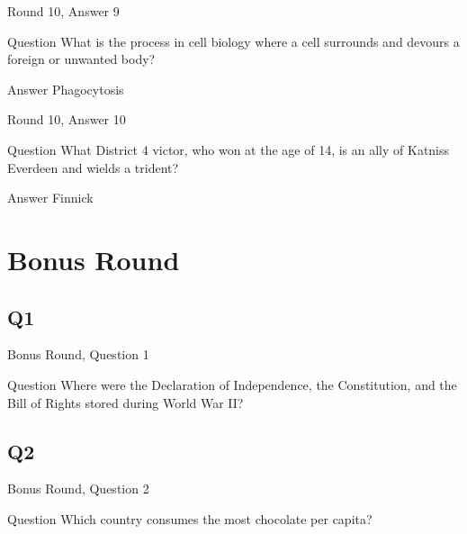 \documentclass[11pt]{beamer}
\begin{document}
\begin{frame}[t]{Round 10, Answer 9}
\vspace{2em}
\begin{block}{Question}
What is the process in cell biology where a cell surrounds and devours a foreign or unwanted body\@?
\end{block}
\pause{}
\begin{block}{Answer}
Phagocytosis
\end{block}
\end{frame}
    

\begin{frame}[t]{Round 10, Answer 10}
\vspace{2em}
\begin{block}{Question}
What District 4 victor, who won at the age of 14, is an ally of Katniss Everdeen and wields a trident\@?
\end{block}
\pause{}
\begin{block}{Answer}
Finnick
\end{block}
\end{frame}
    

\section{Bonus Round}
    

\subsection*{Q1}
\begin{frame}[t]{Bonus Round, Question 1}
\vspace{2em}
\begin{block}{Question}
Where were the Declaration of Independence, the Constitution, and the Bill of Rights stored during World War II\@?
\end{block}
\end{frame}
    

\subsection*{Q2}
\begin{frame}[t]{Bonus Round, Question 2}
\vspace{2em}
\begin{block}{Question}
Which country consumes the most chocolate per capita\@?
\end{block}
\end{frame}
    
\end{document}
